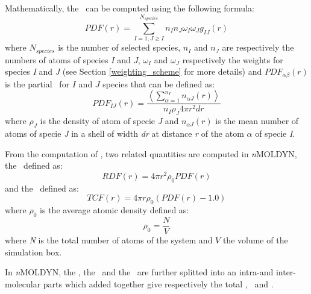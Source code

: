 \documentclass[a4paper,11pt]{report}
\newcommand{\NMOLDYN}{\textit{n}MOLDYN}
\begin{document}
Mathematically, the \PDF\ can be computed using the following formula:
\begin{equation}
PDF(r)=\sum_{I = 1,J\ge I}^{N_{species}}n_In_J \omega_I \omega_J g_{IJ}(r)
\end{equation}
where $N_{species}$ is the number of selected species, $n_I$ and $n_J$ are respectively the numbers of atoms of species 
\textit{I} and \textit{J}, $\omega_I$ and $\omega_J$ respectively the weights for species \textit{I} and \textit{J} 
(see Section \ref{weighting_scheme} for more details) and $PDF_{\alpha\beta}(r)$ is the partial \PDF\ for $I$ 
and $J$ species that can be defined as:
\begin{equation}
\label{eq:gij}
PDF_{IJ}(r) = \frac{\left\langle\sum_{\alpha = 1}^{n_I} n_{\alpha J}(r)\right\rangle}{n_I\rho_J 4\pi r^2dr}
\end{equation}
where $\rho_J$ is the density of atom of specie \textit{J} and $n_{\alpha J}(r)$ is the mean number of atoms of specie 
\textit{J} in a shell of width \textit{dr} at distance \textit{r} of the atom $\alpha$ of specie \textit{I}.

From the computation of \PDF , two related quantities are computed in \NMOLDYN, the \RDF\ defined as:
\begin{equation}
RDF(r) = 4 \pi r^2 \rho_0 PDF(r)
\end{equation}
and the \TCF\ defined as:
\begin{equation}
TCF(r) = 4\pi r \rho_0 (PDF(r) - 1.0)
\end{equation}
where $\rho_0$ is the average atomic density defined as:
\begin{equation}
\rho_0 = \frac{N}{V}
\end{equation}
where \textit{N} is the total number of atoms of the system and $V$ the volume of the simulation box.

In \NMOLDYN, the \PDF , the \RDF\ and the \TCF\ are further splitted into an intra-and inter-molecular parts 
which added together give respectively the total \PDF , \RDF\ and \TCF .
\end{document}
